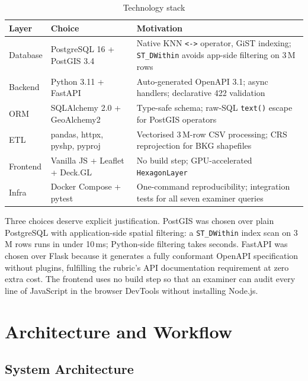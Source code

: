 \documentclass[12pt,a4paper]{article}
\begin{document}
\begin{table}[H]
\centering
\caption{Technology stack}
\label{tab:stack}
\begin{tabularx}{\textwidth}{llX}
\toprule
\textbf{Layer} & \textbf{Choice} & \textbf{Motivation} \\
\midrule
Database  & PostgreSQL 16 + PostGIS 3.4   & Native KNN \texttt{<->} operator, GiST indexing; \texttt{ST\_DWithin} avoids app-side filtering on 3\,M rows \\
Backend   & Python 3.11 + FastAPI          & Auto-generated OpenAPI 3.1; async handlers; declarative 422 validation \\
ORM       & SQLAlchemy 2.0 + GeoAlchemy2   & Type-safe schema; raw-SQL \texttt{text()} escape for PostGIS operators \\
ETL       & pandas, httpx, pyshp, pyproj   & Vectorised 3\,M-row CSV processing; CRS reprojection for BKG shapefiles \\
Frontend  & Vanilla JS + Leaflet + Deck.GL & No build step; GPU-accelerated \texttt{HexagonLayer} \\
Infra     & Docker Compose + pytest        & One-command reproducibility; integration tests for all seven examiner queries \\
\bottomrule
\end{tabularx}
\end{table}

Three choices deserve explicit justification. PostGIS was chosen over plain PostgreSQL with application-side spatial filtering: a \texttt{ST\_DWithin} index scan on 3\,M rows runs in under 10\,ms; Python-side filtering takes seconds. FastAPI was chosen over Flask because it generates a fully conformant OpenAPI specification without plugins, fulfilling the rubric's API documentation requirement at zero extra cost. The frontend uses no build step so that an examiner can audit every line of JavaScript in the browser DevTools without installing Node.js.

\section{Architecture and Workflow}

\subsection{System Architecture}
\end{document}
